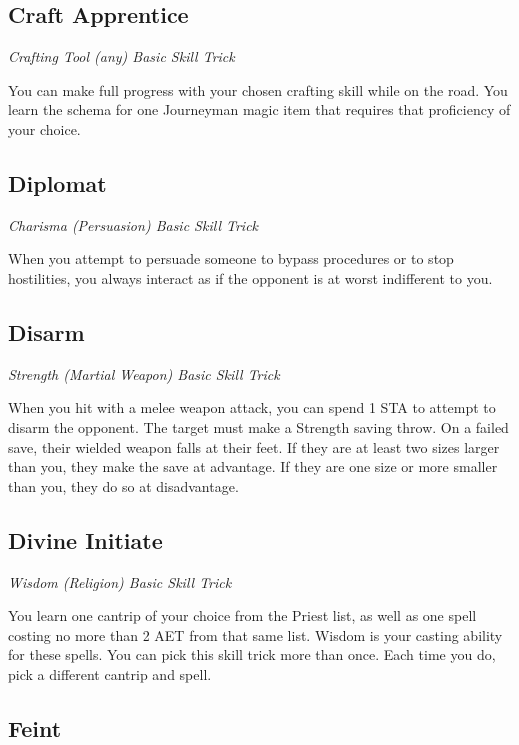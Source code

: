 \subsection{Craft Apprentice}\label{st:craft-apprentice}

\textit{Crafting Tool (any) Basic Skill Trick}

You can make full progress with your chosen crafting skill while on the road. You learn the schema for one Journeyman magic item that requires that proficiency of your choice.

\subsection{Diplomat}\label{st:diplomat}

\textit{Charisma (Persuasion) Basic Skill Trick}

When you attempt to persuade someone to bypass procedures or to stop hostilities, you always interact as if the opponent is at worst indifferent to you.

\subsection{Disarm}

\textit{Strength (Martial Weapon) Basic Skill Trick}

When you hit with a melee weapon attack, you can spend 1 STA to attempt to disarm the opponent. The target must make a Strength saving throw. On a failed save, their wielded weapon falls at their feet. If they are at least two sizes larger than you, they make the save at advantage. If they are one size or more smaller than you, they do so at disadvantage. 

\subsection{Divine Initiate}

\textit{Wisdom (Religion) Basic Skill Trick}

You learn one cantrip of your choice from the Priest list, as well as one spell costing no more than 2 AET from that same list. Wisdom is your casting ability for these spells. You can pick this skill trick more than once. Each time you do, pick a different cantrip and spell.

\subsection{Feint}\label{st:feint}


